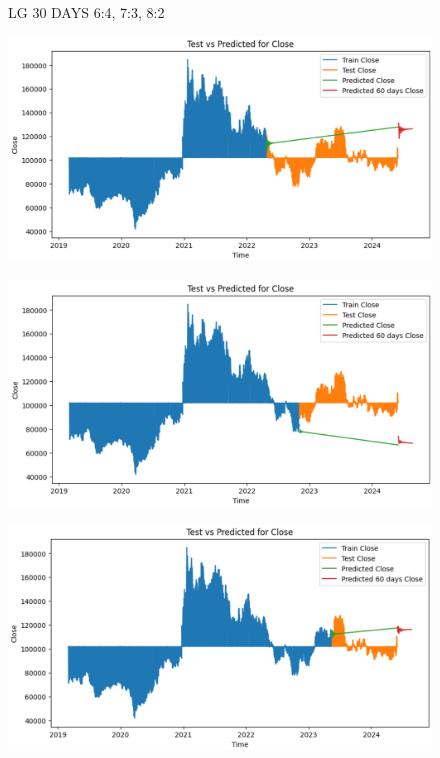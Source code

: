 \documentclass{article}
\begin{document}
\begin{multicols}{2}
\begin{figure}[H]
\begin{minipage}{0.15\textwidth}
    \label{fig:3}
    \end{minipage}
    \caption{LG 30 DAYS  6:4, 7:3, 8:2 }
\end{figure}

\begin{figure}[H]
    \centering
    \begin{minipage}{0.15\textwidth}
    \centering
    \includegraphics[width=1\textwidth]{Image/VARMA/LG/6_4/60.png}
   
    \label{fig:1}
    \end{minipage}%
    \begin{minipage}{0.15\textwidth}
    \centering
    \includegraphics[width=1\textwidth]{Image/VARMA/LG/7_3/60.png}
  
    \label{fig:2}
    \end{minipage}%
    \begin{minipage}{0.15\textwidth}
    \centering
    \includegraphics[width=1\textwidth]{Image/VARMA/LG/8_2/60.png}


\end{minipage}
\end{figure}
\end{multicols}
\end{document}
